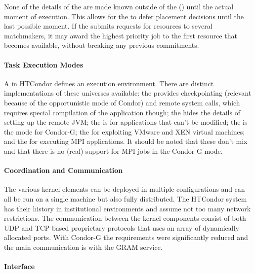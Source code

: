\documentclass{sig-alternate}
\begin{document}
None of the details of the  are made known outside of the
 () until the actual moment of execution.
This allows for the  to defer placement decisions until the last
possible moment. If the  submits requests for resources to
several matchmakers, it may award the highest priority job to the first
resource that becomes available, without breaking any previous commitments.

\paragraph{Task Execution Modes}

A  in HTCondor defines an execution environment. There are
distinct implementations of these universes available: the  provides checkpointing (relevant because of the opportunistic mode of
Condor) and remote system calls, which requires special compilation of the
application though; the  hides the details of setting up
the remote JVM; the  is for applications that can't
be modified; the  is the mode for Condor-G; the
 for exploiting VMware and XEN virtual machines; and the
 for executing MPI applications. It should be noted
that these  don't mix and that there is no (real) support
for MPI jobs in the Condor-G mode.

\paragraph{Coordination and Communication}

The various kernel elements can be deployed in multiple configurations and can
all be run on a single machine but also fully distributed. The HTCondor system
has their history in institutional environments and assume not too many network
restrictions. The
communication between the kernel components consist of both UDP and TCP based
proprietary protocols that uses an array of dynamically allocated ports. With
Condor-G the requirements were significantly reduced and the main communication
is with the GRAM service.

\paragraph{Interface}
\end{document}
